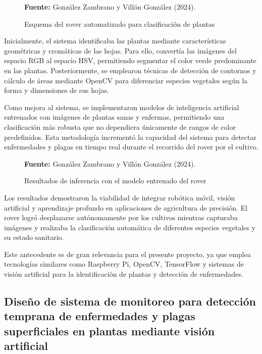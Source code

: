 \begin{figure}[H]
    \centering
    \caption{Esquema del rover automatizado para clasificación de plantas}
    \label{fig:1_1_3}
    \vspace{0.2cm}
    \footnotesize \textbf{Fuente:} González Zambrano y Villón González (2024).
\end{figure}

Inicialmente, el sistema identificaba las plantas mediante características geométricas y cromáticas de las hojas. Para ello, convertía las imágenes del espacio RGB al espacio HSV, permitiendo segmentar el color verde predominante en las plantas. Posteriormente, se emplearon técnicas de detección de contornos y cálculo de áreas mediante OpenCV para diferenciar especies vegetales según la forma y dimensiones de sus hojas.

Como mejora al sistema, se implementaron modelos de inteligencia artificial entrenados con imágenes de plantas sanas y enfermas, permitiendo una clasificación más robusta que no dependiera únicamente de rangos de color predefinidos. Esta metodología incrementó la capacidad del sistema para detectar enfermedades y plagas en tiempo real durante el recorrido del rover por el cultivo.

\begin{figure}[H]
    \centering
    \caption{Resultados de inferencia con el modelo entrenado del rover}
    \label{fig:1_1_4}
    \vspace{0.2cm}
    \footnotesize \textbf{Fuente:} González Zambrano y Villón González (2024).
\end{figure}

Los resultados demostraron la viabilidad de integrar robótica móvil, visión artificial y aprendizaje profundo en aplicaciones de agricultura de precisión. El rover logró desplazarse autónomamente por los cultivos mientras capturaba imágenes y realizaba la clasificación automática de diferentes especies vegetales y su estado sanitario.

Este antecedente es de gran relevancia para el presente proyecto, ya que emplea tecnologías similares como Raspberry Pi, OpenCV, TensorFlow y sistemas de visión artificial para la identificación de plantas y detección de enfermedades.


\subsection{Diseño de sistema de monitoreo para detección temprana de enfermedades y plagas superficiales en plantas mediante visión artificial}


